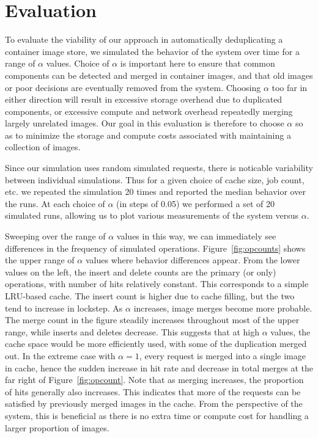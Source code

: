 \documentclass[sigconf]{acmart}
\begin{document}
\section{Evaluation}

To evaluate the viability of our approach in automatically deduplicating a container image store,
we simulated the behavior of the system over time for a range of $\alpha$ values.
Choice of $\alpha$ is important here to ensure that common components can be detected and merged in container images,
and that old images or poor decisions are eventually removed from the system.
Choosing $\alpha$ too far in either direction will result in excessive storage overhead due to duplicated components,
or excessive compute and network overhead repeatedly merging largely unrelated images.
Our goal in this evaluation is therefore to choose $\alpha$ so as to minimize the storage and compute costs associated with maintaining a collection of images.

Since our simulation uses random simulated requests,
there is noticable variability between individual simulations.
Thus for a given choice of cache size, job count, etc.
we repeated the simulation 20 times and reported the median behavior over the runs.
At each choice of $\alpha$ (in steps of 0.05)
we performed a set of 20 simulated runs,
allowing us to plot various measurements of the system versus $\alpha$.

Sweeping over the range of $\alpha$ values in this way,
we can immediately see differences in the frequency of simulated operations.
Figure~\ref{fig:opcounts} shows the upper range of $\alpha$ values where behavior differences appear.
From the lower values on the left,
the insert and delete counts are the primary (or only) operations,
with number of hits relatively constant.
This corresponds to a simple LRU-based cache.
The insert count is higher due to cache filling,
but the two tend to increase in lockstep.
As $\alpha$ increases,
image merges become more probable.
The merge count in the figure steadily increases throughout most of the upper range,
while inserts and deletes decrease.
This suggests that at high $\alpha$ values,
the cache space would be more efficiently used,
with some of the duplication merged out.
In the extreme case with $\alpha=1$,
every request is merged into a single image in cache,
hence the sudden increase in hit rate and decrease in total merges at the far right of Figure~\ref{fig:opcount}.
Note that as merging increases,
the proportion of hits generally also increases.
This indicates that more of the requests can be satisfied by previously merged images in the cache.
From the perspective of the system,
this is beneficial as there is no extra time or compute cost for handling a larger proportion of images.
\end{document}
